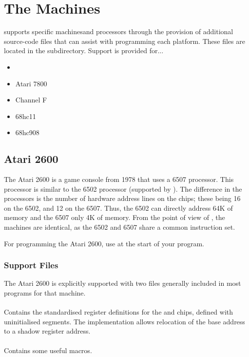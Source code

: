 \chapter{The Machines}

\dasm supports specific machinesand processors through the provision of additional source-code files that can assist with programming each platform. These files are located in the  subdirectory. Support is provided for...

\begin{itemize}
\item {}
\item Atari 7800
\item Channel F
\item 68hc11
\item 68hc908
\end{itemize}


\section{Atari 2600}
\label{machine:atari2600}

The Atari 2600 is a game console from 1978 that uses a 6507 processor. This processor is similar to the 6502 processor (supported by \dasm). The difference in the processors is the number of hardware address lines on the chips; these being 16 on the 6502, and 12 on the 6507. Thus, the 6502 can directly address 64K of memory and the 6507 only 4K of memory.  From the point of view of \dasm, the machines are identical, as the 6502 and 6507 share a common instruction set.

For programming the Atari 2600, use  at the start of your program.

\subsection{Support Files}

The Atari 2600 is explicitly supported with two files generally included in most programs for that machine.

\subsubsection{}

Contains the standardised register definitions for the  and  chips, defined with uninitialised segments. The implementation allows relocation of the  base address to a shadow register address.

\subsubsection{}
\label{support6502}

Contains some useful macros.


